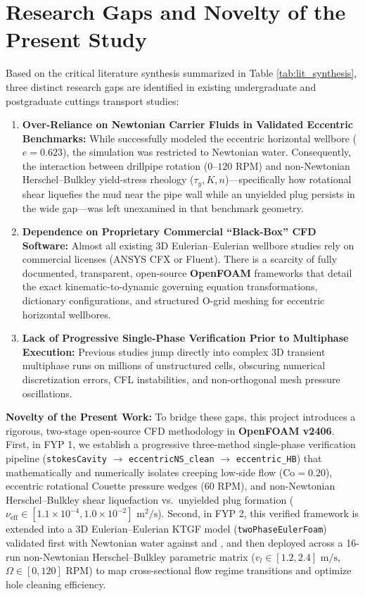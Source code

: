 \section{Research Gaps and Novelty of the Present Study}
Based on the critical literature synthesis summarized in Table \ref{tab:lit_synthesis}, three distinct research gaps are identified in existing undergraduate and postgraduate cuttings transport studies:
\begin{enumerate}
    \item \textbf{Over-Reliance on Newtonian Carrier Fluids in Validated Eccentric Benchmarks:} While \citet{Shehab2015} successfully modeled the \citet{Osgouei2010} eccentric horizontal wellbore ($e = 0.623$), the simulation was restricted to Newtonian water. Consequently, the interaction between drillpipe rotation ($0\text{--}120\text{ RPM}$) and non-Newtonian Herschel--Bulkley yield-stress rheology ($\tau_y, K, n$)—specifically how rotational shear liquefies the mud near the pipe wall while an unyielded plug persists in the wide gap—was left unexamined in that benchmark geometry.
    \item \textbf{Dependence on Proprietary Commercial ``Black-Box'' CFD Software:} Almost all existing 3D Eulerian--Eulerian wellbore studies \citep{Shehab2015, Hajipour2020, Khaled2020, Ferroudji2022} rely on commercial licenses (ANSYS CFX or Fluent). There is a scarcity of fully documented, transparent, open-source \textbf{OpenFOAM} frameworks that detail the exact kinematic-to-dynamic governing equation transformations, dictionary configurations, and structured O-grid meshing for eccentric horizontal wellbores.
    \item \textbf{Lack of Progressive Single-Phase Verification Prior to Multiphase Execution:} Previous studies jump directly into complex 3D transient multiphase runs on millions of unstructured cells, obscuring numerical discretization errors, CFL instabilities, and non-orthogonal mesh pressure oscillations.
\end{enumerate}

\textbf{Novelty of the Present Work:} To bridge these gaps, this project introduces a rigorous, two-stage open-source CFD methodology in \textbf{OpenFOAM v2406}. First, in FYP 1, we establish a progressive three-method single-phase verification pipeline (\texttt{stokesCavity} $\rightarrow$ \texttt{eccentricNS\_clean} $\rightarrow$ \texttt{eccentric\_HB}) that mathematically and numerically isolates creeping low-side flow ($\text{Co} = 0.20$), eccentric rotational Couette pressure wedges ($60\text{ RPM}$), and non-Newtonian Herschel--Bulkley shear liquefaction vs.\ unyielded plug formation ($\nu_{\text{eff}} \in [1.1 \times 10^{-4}, 1.0 \times 10^{-2}]\text{ m}^2/\text{s}$). Second, in FYP 2, this verified framework is extended into a 3D Eulerian--Eulerian KTGF model (\texttt{twoPhaseEulerFoam}) validated first with Newtonian water against \citet{Osgouei2010} and \citet{Shehab2015}, and then deployed across a 16-run non-Newtonian Herschel--Bulkley parametric matrix ($v_l \in [1.2, 2.4]\text{ m/s}$, $\Omega \in [0, 120]\text{ RPM}$) to map cross-sectional flow regime transitions and optimize hole cleaning efficiency.

